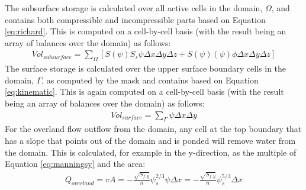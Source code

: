 The subsurface storage is calculated over all active cells in the domain, $\Omega$, and contains both compressible and incompressible parts based on Equation \ref{eq:richard}. This is computed on a cell-by-cell basis (with the result being an array of balances over the domain) as follows:
\begin{eqnarray}
Vol_{subsurface} = \sum_\Omega [ S(\psi)S_s \psi \Delta x \Delta y \Delta z +
S(\psi)(\psi)\phi \Delta x \Delta y \Delta z]
\label{eq:sub_store}
\end{eqnarray}
The surface storage is calculated over the upper surface boundary cells in the domain, $\Gamma$, as computed by the mask and contains based on Equation \ref{eq:kinematic}. This is again computed on a cell-by-cell basis (with the result being an array of balances over the domain) as follows:
\begin{eqnarray}
Vol_{surface} =  \sum_\Gamma \psi \Delta x \Delta y  
\label{eq:surf_store}
\end{eqnarray}
For the overland flow outflow from the domain, any cell at the top boundary that has a slope that points out of the domain and is ponded will remove water from the domain.  This is calculated, for example in the y-direction, as the multiple of Equation \ref{eq:manningsy} and the area: 
\begin{eqnarray}
Q_{overland}=vA= -\frac{\sqrt{S_{f,y}}}{n}\psi_{s}^{2/3}\psi \Delta x=- \frac{\sqrt{S_{f,y}}}{n}\psi_{s}^{5/3}\Delta x
\label{eq:outflow}
\end{eqnarray}
